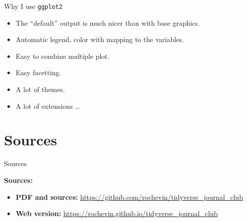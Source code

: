 \documentclass[14pt,ignorenonframetext,]{bredelebeamer}
\providecommand{\tightlist}{%
  \setlength{\itemsep}{0pt}\setlength{\parskip}{0pt}}
\begin{document}
\begin{frame}{Why I use \texttt{ggplot2}}

\Large

\begin{itemize}
\tightlist
\item
  The ``default'' output is much nicer than with base graphics.
\item
  Automatic legend, color with mapping to the variables.
\item
  Easy to combine multiple plot.
\item
  Easy facetting.
\item
  A lot of themes.
\item
  A lot of extensions \ldots{}
\end{itemize}

\end{frame}

\section{Sources}\label{sources}

\begin{frame}{Sources}

\Large

\textbf{Sources:}

\begin{itemize}
\tightlist
\item
  \textbf{PDF and sources:}
  \url{https://github.com/rochevin/tidyverse_journal_club}
\item
  \textbf{Web version:}
  \url{https://rochevin.github.io/tidyverse_journal_club}
\end{itemize}

\end{frame}
\end{document}
